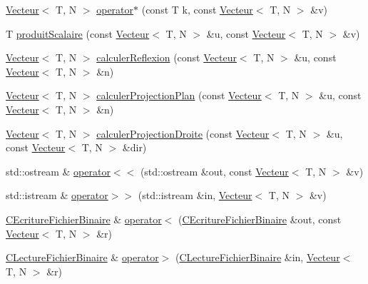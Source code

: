 \begin{DoxyCompactItemize}
\item 
\hyperlink{class_vecteur}{Vecteur}$<$ T, N $>$ \hyperlink{class_vecteur_aac39e0409c0da08a00dad3e2416ab5ea}{operator$\ast$} (const T k, const \hyperlink{class_vecteur}{Vecteur}$<$ T, N $>$ \&v)
\item 
T \hyperlink{class_vecteur_affc87c5768a1f6f1ccaf3acfeebdb69a}{produit\-Scalaire} (const \hyperlink{class_vecteur}{Vecteur}$<$ T, N $>$ \&u, const \hyperlink{class_vecteur}{Vecteur}$<$ T, N $>$ \&v)
\item 
\hyperlink{class_vecteur}{Vecteur}$<$ T, N $>$ \hyperlink{class_vecteur_ad2c770e2ca9e1bd65434222c38d2d936}{calculer\-Reflexion} (const \hyperlink{class_vecteur}{Vecteur}$<$ T, N $>$ \&u, const \hyperlink{class_vecteur}{Vecteur}$<$ T, N $>$ \&n)
\item 
\hyperlink{class_vecteur}{Vecteur}$<$ T, N $>$ \hyperlink{class_vecteur_ace8741714bc2dbdf7139a69ff2ca836c}{calculer\-Projection\-Plan} (const \hyperlink{class_vecteur}{Vecteur}$<$ T, N $>$ \&u, const \hyperlink{class_vecteur}{Vecteur}$<$ T, N $>$ \&n)
\item 
\hyperlink{class_vecteur}{Vecteur}$<$ T, N $>$ \hyperlink{class_vecteur_a9f368dc4afa8b946826484b58bdfc370}{calculer\-Projection\-Droite} (const \hyperlink{class_vecteur}{Vecteur}$<$ T, N $>$ \&u, const \hyperlink{class_vecteur}{Vecteur}$<$ T, N $>$ \&dir)
\item 
std\-::ostream \& \hyperlink{class_vecteur_afbf2befaa82119cb39ad76836fb1f5a5}{operator$<$$<$} (std\-::ostream \&out, const \hyperlink{class_vecteur}{Vecteur}$<$ T, N $>$ \&v)
\item 
std\-::istream \& \hyperlink{class_vecteur_a9f59dfe75ec01dca15119ee87d80352f}{operator$>$$>$} (std\-::istream \&in, \hyperlink{class_vecteur}{Vecteur}$<$ T, N $>$ \&v)
\item 
\hyperlink{class_c_ecriture_fichier_binaire}{C\-Ecriture\-Fichier\-Binaire} \& \hyperlink{class_vecteur_abacd1aa27db76db0c5b31b8350155878}{operator$<$} (\hyperlink{class_c_ecriture_fichier_binaire}{C\-Ecriture\-Fichier\-Binaire} \&out, const \hyperlink{class_vecteur}{Vecteur}$<$ T, N $>$ \&r)
\item 
\hyperlink{class_c_lecture_fichier_binaire}{C\-Lecture\-Fichier\-Binaire} \& \hyperlink{class_vecteur_a8019d8c25a0d412f51283351c814166f}{operator$>$} (\hyperlink{class_c_lecture_fichier_binaire}{C\-Lecture\-Fichier\-Binaire} \&in, \hyperlink{class_vecteur}{Vecteur}$<$ T, N $>$ \&r)
\end{DoxyCompactItemize}



